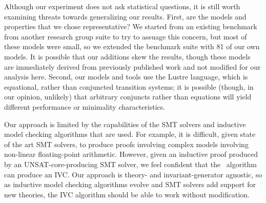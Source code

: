 
Although our experiment does not ask statistical questions, it is still worth examining threats towards generalizing our results.  First, are the models and properties that we chose representative?  We started from an existing benchmark from another research group suite to try to assuage this concern, but most of these models were small, so we extended the benchmark suite with 81 of our own models.  It is possible that our additions skew the results, though these models are immediately derived from previously published work and not modified for our analysis here.  Second, our models and tools use the Lustre language, which is equational, rather than conjuncted transition systems; it is possible (though, in our opinion, unlikely) that arbitrary conjuncts rather than equations will yield different performance or minimality characteristics.

Our approach is limited by the capabilities of the SMT solvers and inductive model checking algorithms that are used.  For example, it is difficult, given state of the art SMT solvers, to produce proofs involving complex models involving non-linear floating-point arithmetic.  However, given an inductive proof produced by an UNSAT-core-producing SMT solver, we feel confident that the \ucalg\ algorithm can produce an IVC.  Our approach is theory- and invariant-generator agnostic, so as inductive model checking algorithms evolve and SMT solvers add support for new theories, the IVC algorithm should be able to work without modification.

